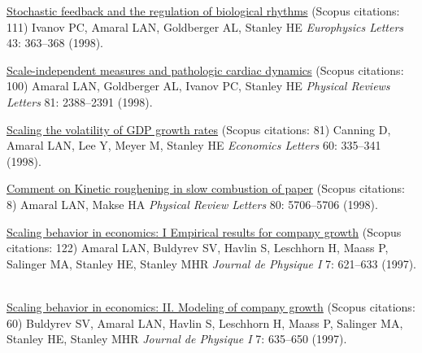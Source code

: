 \NumberedItem{\makebox[0.8cm][r]{[18]}}
\href{/people/amaral/stochastic-feedback-and-the-regulation-of-biological-rhythms}
{Stochastic feedback and the regulation of biological rhythms}
    (Scopus citations: 111)
\newline
Ivanov PC, Amaral LAN, Goldberger AL, Stanley HE
\newline
\textit{Europhysics Letters}
    43:
363--368 (1998).
\newline
\Gap
~
\Gap

\NumberedItem{\makebox[0.8cm][r]{[17]}}
\href{/people/amaral/scale-independent-measures-and-pathologic-cardiac-dynamics}
{Scale-independent measures and pathologic cardiac dynamics}
    (Scopus citations: 100)
\newline
Amaral LAN, Goldberger AL, Ivanov PC, Stanley HE
\newline
\textit{Physical Reviews Letters}
    81:
2388--2391 (1998).
\newline
\Gap
~
\Gap

\NumberedItem{\makebox[0.8cm][r]{[16]}}
\href{/people/amaral/scaling-the-volatility-of-gdp-growth-rates}
{Scaling the volatility of GDP growth rates}
    (Scopus citations: 81)
\newline
Canning D, Amaral LAN, Lee Y, Meyer M, Stanley HE
\newline
\textit{Economics Letters}
    60:
335--341 (1998).
\newline
\Gap
~
\Gap

\NumberedItem{\makebox[0.8cm][r]{[15]}}
\href{/people/amaral/comment-on-kinetic-roughening-in-slow-combustion-of-paper}
{Comment on Kinetic roughening in slow combustion of paper}
    (Scopus citations: 8)
\newline
Amaral LAN, Makse HA
\newline
\textit{Physical Review Letters}
    80:
5706--5706 (1998).
\newline
\Gap
~
\Gap

\NumberedItem{\makebox[0.8cm][r]{[14]}}
\href{/people/amaral/scaling-behavior-in-economics-1-empirical-results-for-company-growth}
{Scaling behavior in economics: I Empirical results for company growth}
    (Scopus citations: 122)
\newline
Amaral LAN, Buldyrev SV, Havlin S, Leschhorn H, Maass P, Salinger MA, Stanley HE, Stanley MHR
\newline
\textit{Journal de Physique I}
    7:
621--633 (1997).
\newline
\Gap
~
\Gap

\NumberedItem{\makebox[0.8cm][r]{[13]}}
\href{/people/amaral/scaling-behavior-in-economics-2-modeling-of-company-growth}
{Scaling behavior in economics: II. Modeling of company growth}
    (Scopus citations: 60)
\newline
Buldyrev SV, Amaral LAN, Havlin S, Leschhorn H, Maass P, Salinger MA, Stanley HE, Stanley MHR
\newline
\textit{Journal de Physique I}
    7:
635--650 (1997).
\newline
\Gap
~
\Gap

